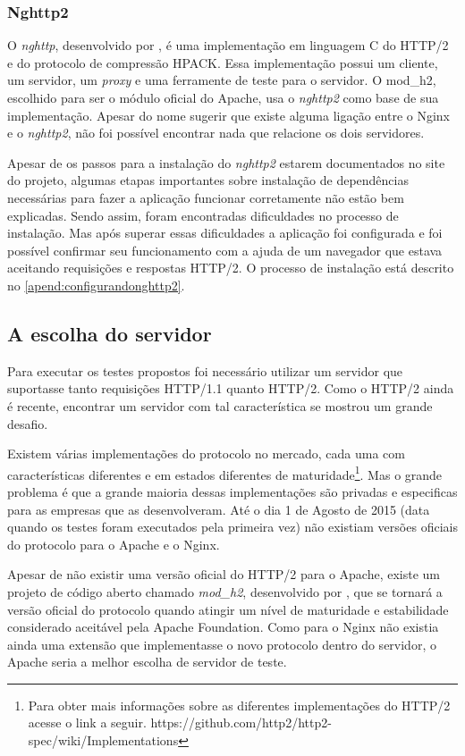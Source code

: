 \subsubsection{Nghttp2}
\label{nghttp2}

O \textit{nghttp}, desenvolvido por , é uma implementação em linguagem C do HTTP/2 e do protocolo de compressão HPACK. Essa implementação possui um cliente, um servidor, um \textit{proxy} e uma ferramente de teste para o servidor. O mod\_h2, escolhido para ser o módulo oficial do Apache, usa o \textit{nghttp2} como base de sua implementação. Apesar do nome sugerir que existe alguma ligação entre o Nginx e o \textit{nghttp2}, não foi possível encontrar nada que relacione os dois servidores.

Apesar de os passos para a instalação do \textit{nghttp2} estarem documentados no site do projeto, algumas etapas importantes sobre instalação de dependências necessárias para fazer a aplicação funcionar corretamente não estão bem explicadas. Sendo assim, foram encontradas dificuldades no processo de instalação. Mas após superar essas dificuldades a aplicação foi configurada e foi possível confirmar seu funcionamento com a ajuda de um navegador que estava aceitando requisições e respostas HTTP/2. O processo de instalação está descrito no \autoref{apend:configurandonghttp2}.

\subsection{A escolha do servidor}
\label{aescolhadoservidor}

Para executar os testes propostos foi necessário utilizar um servidor que suportasse tanto requisições HTTP/1.1 quanto HTTP/2. Como o HTTP/2 ainda é recente, encontrar um servidor com tal característica se mostrou um grande desafio.

Existem várias implementações do protocolo no mercado, cada uma com características diferentes e em estados diferentes de maturidade\footnote{Para obter mais informações sobre as diferentes implementações do HTTP/2 acesse o link a seguir. https://github.com/http2/http2-spec/wiki/Implementations}. Mas o grande problema é que a grande maioria dessas implementações são privadas e especificas para as empresas que as desenvolveram. Até o dia 1 de Agosto de 2015 (data quando os testes foram executados pela primeira vez) não existiam versões oficiais do protocolo para o Apache e o Nginx.

Apesar de não existir uma versão oficial do HTTP/2 para o Apache, existe um projeto de código aberto chamado \textit{mod\_h2}, desenvolvido por , que se tornará a versão oficial do protocolo quando atingir um nível de maturidade e estabilidade considerado aceitável pela Apache Foundation. Como para o Nginx não existia ainda uma extensão que implementasse o novo protocolo dentro do servidor, o Apache seria a melhor escolha de servidor de teste.

